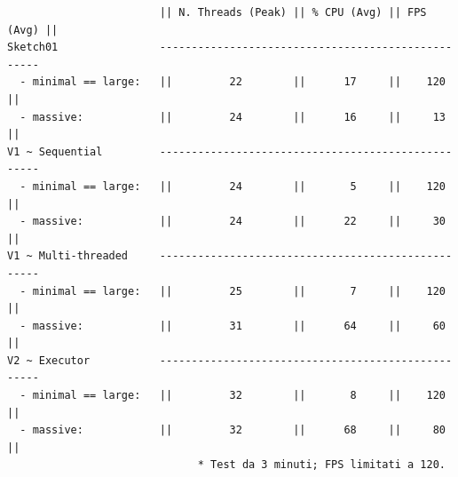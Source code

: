 \begin{verbatim}
                        || N. Threads (Peak) || % CPU (Avg) || FPS (Avg) ||
Sketch01                ---------------------------------------------------
  - minimal == large:   ||         22        ||      17     ||    120    ||
  - massive:            ||         24        ||      16     ||     13    ||
V1 ~ Sequential         ---------------------------------------------------
  - minimal == large:   ||         24        ||       5     ||    120    ||
  - massive:            ||         24        ||      22     ||     30    ||
V1 ~ Multi-threaded     ---------------------------------------------------
  - minimal == large:   ||         25        ||       7     ||    120    ||
  - massive:            ||         31        ||      64     ||     60    ||
V2 ~ Executor           ---------------------------------------------------
  - minimal == large:   ||         32        ||       8     ||    120    ||
  - massive:            ||         32        ||      68     ||     80    ||
                              * Test da 3 minuti; FPS limitati a 120.
\end{verbatim}